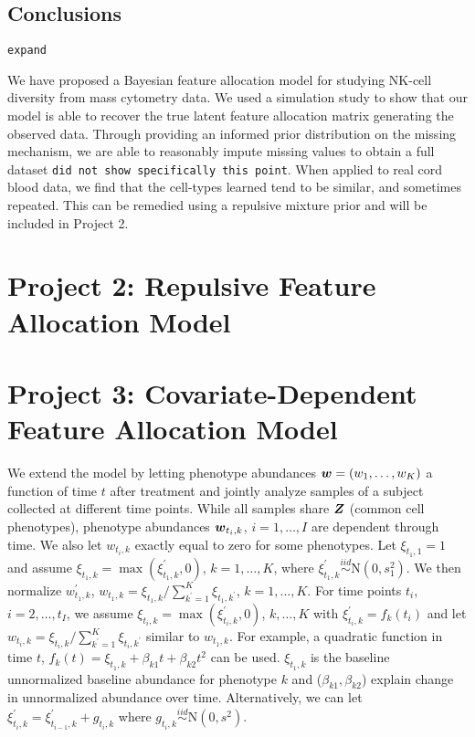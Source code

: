 \documentclass[12pt,]{article}
\newcommand{\N}{ \mathcal{N} }
\newcommand{\iid}{\overset{iid}{\sim}}
\def\N{\text{N}}
\newcommand{\bZ}{\mbox{\boldmath $Z$}}
\newcommand{\bw}{\mbox{\boldmath $w$}}
\begin{document}
\subsection{Conclusions}

{\tt expand}

We have proposed a Bayesian feature allocation model for studying NK-cell
diversity from mass cytometry data. We used a simulation study to show that our
model is able to recover the true latent feature allocation matrix generating
the observed data. Through providing an informed prior distribution on the
missing mechanism, we are able to reasonably impute missing values to obtain a
full dataset
%
{\tt did not show specifically this point}.
%
When applied to real cord blood data, we find that the
cell-types learned tend to be similar, and sometimes repeated. This can be
remedied using a repulsive mixture prior and will be included in Project 2.


\section{Project 2: Repulsive Feature Allocation Model}\label{sec:proj2}

\section{Project 3: Covariate-Dependent Feature Allocation Model}\label{sec:proj3}

We extend the model by letting phenotype abundances $\bw=(w_1, \ldots, w_K)$ a
function of time $t$ after treatment and jointly analyze samples of a subject
collected at different time points. While all samples share $\bZ$ (common cell
phenotypes), phenotype abundances $\bw_{t_i, k}$, $i=1, \ldots, I$ are
dependent through time.  We also let $w_{t_i,k}$ exactly equal to zero for some
phenotypes. Let $\xi_{t_1,1}=1$ and assume $\xi_{t_1,k} =
\max(\xi^\prime_{t_1,k}, 0)$, $k=1, \ldots, K$, where $\xi^\prime_{t_1,k} \iid
\N(0, s^2_1)$. We then normalize $w^\prime_{t_1,k}$,  $w_{t_1,k} =
\xi_{t_1,k}/\sum_{k^\prime=1}^K \xi_{t_1, k^\prime}$, $k=1, \ldots, K$. For
time points $t_i$, $i=2, \ldots, t_I$, we assume $\xi_{t_i,k} =
\max(\xi^\prime_{t_i,k}, 0)$, $k, \ldots, K$ with $\xi^\prime_{t_i,k} =
f_k(t_i)$ and let $w_{t_i,k} = \xi_{t_i,k}/\sum_{k^\prime=1}^K
\xi_{t_i,k^\prime}$ similar to $w_{t_1,k}$.  For example, a quadratic function
in time $t$, $f_k(t) = \xi_{t_1,k} + \beta_{k1}t + \beta_{k2}t^2$ can be used.
$\xi_{t_1,k}$ is the baseline unnormalized baseline abundance for phenotype $k$
and ($\beta_{k1}, \beta_{k2}$) explain change in unnormalized abundance over
time. Alternatively, we can let $\xi^\prime_{t_i,k} = \xi^\prime_{t_{i-1},k} +
g_{t_i,k}$ where $g_{t_i, k} \iid \N(0, s^2)$.
\end{document}
